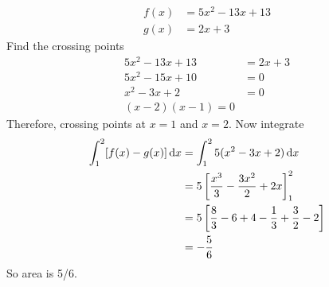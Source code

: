\begin{align*}
    f(x) &= 5x^2 - 13x + 13\\
    g(x) &= 2x + 3
\end{align*}
Find the crossing points
\begin{align*}
    5x^2 - 13x + 13 &= 2x + 3\\
    5x^2 - 15x + 10 &= 0\\
    x^2 - 3x + 2 &= 0\\
    (x-2)(x-1) = 0
\end{align*}
Therefore, crossing points at $x=1$ and $x=2$. Now integrate
\begin{align*}
    \int_1^2 [f(x) - g(x)] \,{\rm d} x &= \int_1^2 5(x^2 - 3x + 2) \,{\rm d} x \\
    &= 5\left[\frac{x^3}{3} - \frac{3x^2}{2} + 2x\right]_1^2\\
    &= 5\left[\frac{8}{3} - 6 + 4 - \frac{1}{3} + \frac{3}{2} - 2 \right] \\
    &= -\frac{5}{6}
\end{align*}
So area is 5/6.